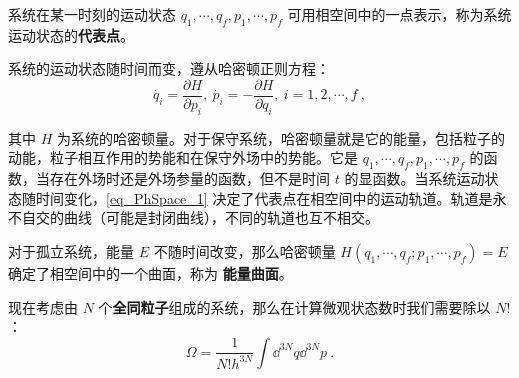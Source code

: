 系统在某一时刻的运动状态 $q_1,\cdots,q_f,p_1,\cdots,p_f$ 可用相空间中的一点表示，称为系统运动状态的\textbf{代表点}。

系统的运动状态随时间而变，遵从哈密顿正则方程：
\begin{equation}\label{eq_PhSpace_1}
\dot{q_i}=\frac{\partial H}{\partial p_i},\ \dot{p_i}=-\frac{\partial H}{\partial q_i},\ i=1,2,\cdots,f~,
\end{equation}

其中 $H$ 为系统的哈密顿量。对于保守系统，哈密顿量就是它的能量，包括粒子的动能，粒子相互作用的势能和在保守外场中的势能。它是 $q_1,\cdots,q_f,p_1,\cdots,p_f$ 的函数，当存在外场时还是外场参量的函数，但不是时间 $t$ 的显函数。当系统运动状态随时间变化，\autoref{eq_PhSpace_1} 决定了代表点在相空间中的运动轨道。轨道是永不自交的曲线（可能是封闭曲线），不同的轨道也互不相交。

对于孤立系统，能量 $E$ 不随时间改变，那么哈密顿量 $H(q_1,\cdots,q_f;p_1,\cdots,p_f)=E$ 确定了相空间中的一个曲面，称为 \textbf{能量曲面}。

现在考虑由 $N$ 个\textbf{全同粒子}组成的系统，那么在计算微观状态数时我们需要除以 $N!$：
\begin{equation}\label{eq_PhSpace_2}
\Omega =\frac{1}{N!h^{3N}} \int {\dd}^{3N} q {\dd}^{3N} p ~.
\end{equation}

